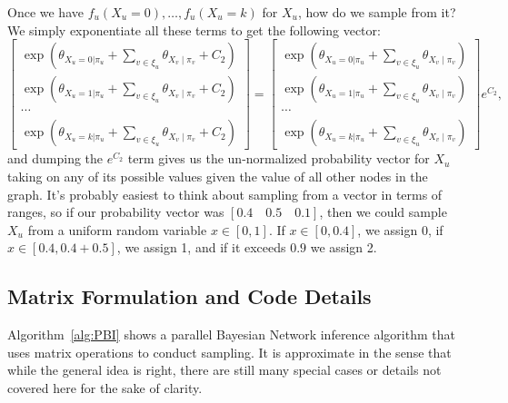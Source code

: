 \documentclass{article} %
\begin{document}
Once we have $f_u(X_u = 0), \ldots, f_u(X_u = k)$ for $X_u$, how do we sample from it? We simply
exponentiate all these terms to get the following vector:
\[
\begin{bmatrix}
\exp \left(\theta_{X_u=0 | \pi_u} + \sum_{v \in \xi_u} \theta_{X_v\mid \pi_v} + C_2\right) \\
\exp \left(\theta_{X_u=1 | \pi_u} + \sum_{v \in \xi_u} \theta_{X_v\mid \pi_v} + C_2\right) \\
\cdots \\
\exp \left(\theta_{X_u=k | \pi_u} + \sum_{v \in \xi_u} \theta_{X_v\mid \pi_v} + C_2\right) 
\end{bmatrix}
=
\begin{bmatrix}
\exp \left(\theta_{X_u=0 | \pi_u} + \sum_{v \in \xi_u} \theta_{X_v\mid \pi_v}\right) \\
\exp \left(\theta_{X_u=1 | \pi_u} + \sum_{v \in \xi_u} \theta_{X_v\mid \pi_v}\right) \\
\cdots \\
\exp \left(\theta_{X_u=k | \pi_u} + \sum_{v \in \xi_u} \theta_{X_v\mid \pi_v}\right) 
\end{bmatrix}
e^{C_2},
\]
and dumping the $e^{C_2}$ term gives us the un-normalized probability vector for $X_u$ taking on any
of its possible values given the value of all other nodes in the graph. It's probably easiest to
think about sampling from a vector in terms of ranges, so if our probability vector was $[0.4 \quad
0.5 \quad 0.1]$, then we could sample $X_u$ from a uniform random variable $ x \in [0,1]$. If $x \in
[0,0.4]$, we assign 0, if $x \in [0.4, 0.4+0.5]$, we assign 1, and if it exceeds $0.9$ we assign 2.

\subsection{Matrix Formulation and Code Details}

Algorithm~\ref{alg:PBI} shows a parallel Bayesian Network inference algorithm that uses matrix
operations to conduct sampling. It is approximate in the sense that while the general idea is right,
there are still many special cases or details not covered here for the sake of clarity.
\end{document}
